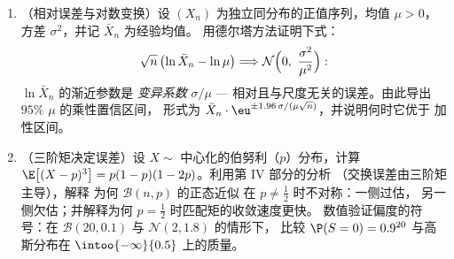 \begin{problem}
\begin{enumerate}[resume]
  \item （相对误差与对数变换）设 $(X_n)$
        为独立同分布的正值序列，均值 $\mu > 0$，方差
        $\sigma^2$，并记 $\bar X_n$ 为经验均值。
        用德尔塔方法证明下式：
        \[
        \sqrt n\,\bigl(\ln\bar X_n - \ln\mu\bigr)
        \Longrightarrow
        \mathcal N\Bigl(0,\ \frac{\sigma^2}{\mu^2}\Bigr) :
        \]
        $\ln\bar X_n$ 的渐近参数是
        \emph{变异系数} $\sigma/\mu$ ---
        相对且与尺度无关的误差。由此导出 $95\%$
        $\mu$ 的乘性置信区间，
        形式为 $\bar X_n\cdot\eu^{\pm1.96\,\sigma/(\mu\sqrt
        n)}$，并说明何时它优于
        加性区间。
  \item （三阶矩决定误差）设 $X \sim$
        中心化的伯努利（$p$）分布，计算 $\E\bigl[(X -
        p)^3\bigr] = p(1-p)(1-2p)$。利用第 IV 部分的分析
        （交换误差由三阶矩主导），解释
        为何 $\mathcal B(n, p)$ 的正态近似
        在 $p \neq \frac12$ 时不对称：一侧过估，
        另一侧欠估；并解释为何
        $p = \frac12$ 时匹配矩的收敛速度更快。
        数值验证偏度的符号：在 $\mathcal
        B(20, 0.1)$ 与 $\mathcal N(2, 1.8)$ 的情形下，
        比较 $\P(S = 0) = 0.9^{20}$ 与高斯分布在
        $\intoo{-\infty}{0.5}$ 上的质量。
\end{enumerate}
\end{problem}
